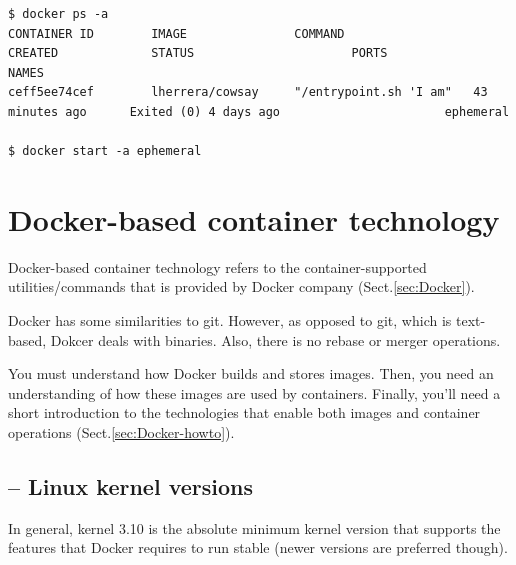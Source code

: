 \begin{verbatim}
$ docker ps -a
CONTAINER ID        IMAGE               COMMAND                  CREATED             STATUS                      PORTS               NAMES
ceff5ee74cef        lherrera/cowsay     "/entrypoint.sh 'I am"   43 minutes ago      Exited (0) 4 days ago                       ephemeral

$ docker start -a ephemeral
\end{verbatim}


\section{Docker-based container technology}
\label{sec:container-Docker-based}

Docker-based container technology refers to the container-supported
utilities/commands that is provided by Docker company (Sect.\ref{sec:Docker}).

Docker has some similarities to git. However, as opposed to git, which is
text-based, Dokcer deals with binaries.
Also, there is no rebase or merger operations.

You must understand how Docker builds and stores images. Then, you need an
understanding of how these images are used by containers. Finally, you’ll need a
short introduction to the technologies that enable both images and container
operations (Sect.\ref{sec:Docker-howto}).


\subsection{-- Linux kernel versions}

In general, kernel 3.10 is the absolute minimum kernel version that supports the
features that Docker requires to run stable (newer versions are preferred though).

